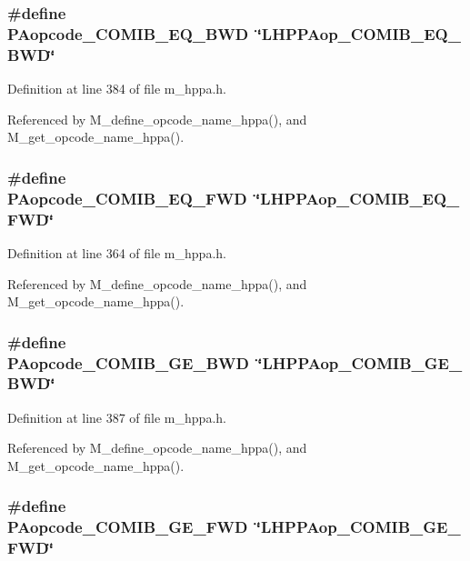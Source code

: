 \subsubsection{\setlength{\rightskip}{0pt plus 5cm}\#define PAopcode\_\-COMIB\_\-EQ\_\-BWD~\char`\"{}LHPPAop\_\-COMIB\_\-EQ\_\-BWD\char`\"{}}\label{m__hppa_8h_14216cb8240cdf4350370eaed0504ad0}




Definition at line 384 of file m\_\-hppa.h.

Referenced by M\_\-define\_\-opcode\_\-name\_\-hppa(), and M\_\-get\_\-opcode\_\-name\_\-hppa().
\subsubsection{\setlength{\rightskip}{0pt plus 5cm}\#define PAopcode\_\-COMIB\_\-EQ\_\-FWD~\char`\"{}LHPPAop\_\-COMIB\_\-EQ\_\-FWD\char`\"{}}\label{m__hppa_8h_48266158c64f912b1dbcd9a12d82e167}




Definition at line 364 of file m\_\-hppa.h.

Referenced by M\_\-define\_\-opcode\_\-name\_\-hppa(), and M\_\-get\_\-opcode\_\-name\_\-hppa().
\subsubsection{\setlength{\rightskip}{0pt plus 5cm}\#define PAopcode\_\-COMIB\_\-GE\_\-BWD~\char`\"{}LHPPAop\_\-COMIB\_\-GE\_\-BWD\char`\"{}}\label{m__hppa_8h_e39adfc1326cb4df6ae57a1eefcd8f34}




Definition at line 387 of file m\_\-hppa.h.

Referenced by M\_\-define\_\-opcode\_\-name\_\-hppa(), and M\_\-get\_\-opcode\_\-name\_\-hppa().
\subsubsection{\setlength{\rightskip}{0pt plus 5cm}\#define PAopcode\_\-COMIB\_\-GE\_\-FWD~\char`\"{}LHPPAop\_\-COMIB\_\-GE\_\-FWD\char`\"{}}\label{m__hppa_8h_fabbbcee3b93da1fa944a964519cdff0}




